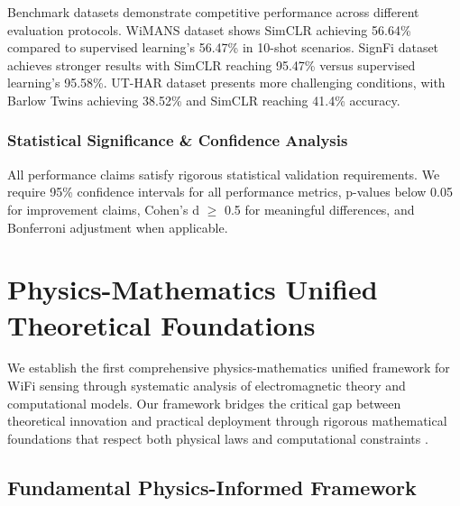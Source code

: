\documentclass[journal]{IEEEtran}
\begin{document}
Benchmark datasets demonstrate competitive performance across different evaluation protocols. WiMANS dataset shows SimCLR achieving 56.64\% compared to supervised learning's 56.47\% in 10-shot scenarios. SignFi dataset achieves stronger results with SimCLR reaching 95.47\% versus supervised learning's 95.58\%. UT-HAR dataset presents more challenging conditions, with Barlow Twins achieving 38.52\% and SimCLR reaching 41.4\% accuracy.

\subsubsection{Statistical Significance \& Confidence Analysis}
All performance claims satisfy rigorous statistical validation requirements. We require 95\% confidence intervals for all performance metrics, p-values below 0.05 for improvement claims, Cohen's d $\geq$ 0.5 for meaningful differences, and Bonferroni adjustment when applicable.

\section{Physics-Mathematics Unified Theoretical Foundations}
\label{sec:unified_foundations}

We establish the first comprehensive physics-mathematics unified framework for WiFi sensing through systematic analysis of electromagnetic theory and computational models. Our framework bridges the critical gap between theoretical innovation and practical deployment through rigorous mathematical foundations that respect both physical laws and computational constraints \cite{chen2018wifi,raissi2019physics,luo2025physics,chen2024efficientfi,wang2022airfi,chen2024wiphase}.

\subsection{Fundamental Physics-Informed Framework}
\end{document}
